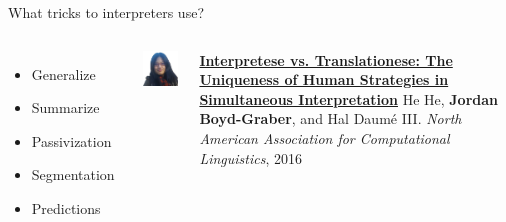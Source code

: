 \documentclass[compress]{beamer}
\begin{document}
\begin{frame}{What tricks to interpreters use?}

  \begin{columns}
  \begin{itemize}
    \item Generalize~\cite{dell92access,cuetos06access}
    \item Summarize
    \item Passivization
    \item Segmentation~\cite{erik11theory,shimizu13iwslt}
    \item Predictions~\cite{levy2013expectation,momma2015timing}
  \end{itemize}
    \centering
        \includegraphics[width=0.4\linewidth]{general_figures/hehe}
        \begin{block}{ {\bf \href{http://cs.colorado.edu/~jbg/docs/2016_naacl_interpretese.pdf}{Interpretese vs. Translationese: The Uniqueness of Human Strategies in Simultaneous Interpretation}}}
He He, {\bf Jordan Boyd-Graber}, and Hal {Daum\'{e} III}.
\emph{North American Association for Computational Linguistics}, 2016
        \end{block}
  \end{columns}



\end{frame}
\end{document}
